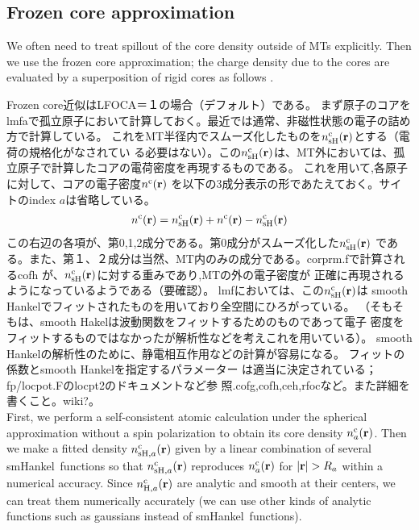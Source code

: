 \documentclass[twocolumn,showpacs,preprintnumbers,amsmath,amssymb,floatfix]{revtex4-1}
\newcommand{\bfr}{{\bf r}}
\def\smh{smHankel}
\def\nc{n^{\rm c}}
\begin{document}
\begin{widetext}
\subsection{Frozen core approximation}
\label{sec:frozencore} We often need to treat spillout of the core
density outside of MTs explicitly. Then we use the frozen core
approximation; the charge density due to the cores are evaluated by a
superposition of rigid cores as follows \cite{lmfchap}.

Frozen core近似はLFOCA＝１の場合（デフォルト）である。
まず原子のコアをlmfaで孤立原子において計算しておく。最近では通常、非磁性状態の電子の詰め方で計算している。
これをMT半径内でスムーズ化したものを$n^{\rm c}_{\rm sH}(\bfr)$とする（電荷の規格化がなされてい
る必要はない）。この$n^{\rm c}_{\rm sH}(\bfr)$は、MT外においては、孤
立原子で計算したコアの電荷密度を再現するものである。
これを用いて,各原子に対して、コアの電子密度$n^{\rm c}(\bfr)$
を以下の3成分表示の形であたえておく。サイトのindex $a$は省略している。
\begin{eqnarray}
n^{\rm c}(\bfr)= 
n^{\rm c}_{\rm sH}(\bfr)
+ n^{\rm c}(\bfr)- n^{\rm c}_{\rm sH}(\bfr)
\label{eq:nc}
\end{eqnarray}
この右辺の各項が、第0,1,2成分である。第0成分がスムーズ化した$n^{\rm c}_{\rm sH}(\bfr)$
である。また、第１、２成分は当然、MT内のみの成分である。corprm.fで計算されるcofh
が、$n^{\rm c}_{\rm sH}(\bfr)$に対する重みであり,MTの外の電子密度が
正確に再現されるようになっているようである（要確認）。
lmfにおいては、この$n^{\rm c}_{\rm sH}(\bfr)$は
smooth Hankelでフィットされたものを用いており全空間にひろがっている。
（そもそもは、smooth Hakelは波動関数をフィットするためのものであって電子
密度をフィットするものではなかったが解析性などを考えこれを用いている）。
smooth Hankelの解析性のために、静電相互作用などの計算が容易になる。
フィットの係数とsmooth Hankelを指定するパラメーター
は適当に決定されている；fp/locpot.Fのlocpt2のドキュメントなど参
照.cofg,cofh,ceh,rfocなど。また詳細を書くこと。wiki?。\\
First, we perform a self-consistent atomic calculation under the
spherical approximation without a spin polarization to obtain its core
density $\nc_a(\bfr)$. Then we make a fitted density $\nc_{{\rm
sH},a}(\bfr)$ given by a linear combination of several \smh\ functions
so that $\nc_{{\rm sH},a}(\bfr)$ reproduces $\nc_{a}(\bfr)$ for
$|\bfr|>R_a$ within a numerical accuracy. Since $\nc_{{\rm H},a}(\bfr)$
are analytic and smooth at their centers, we can treat them numerically
accurately (we can use other kinds of analytic functions such as
gaussians instead of \smh\ functions).
  

\end{widetext}
\end{document}
